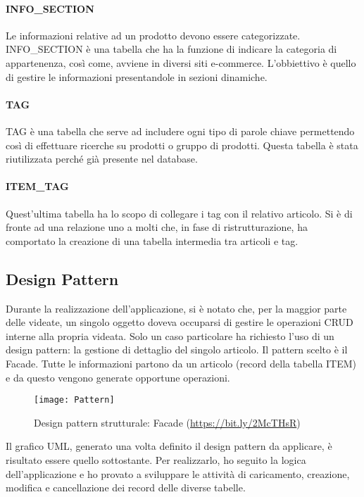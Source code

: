 \paragraph{INFO\_SECTION}
Le informazioni relative ad un prodotto devono essere categorizzate. INFO\_SECTION è una tabella che ha la funzione di indicare la categoria di appartenenza, così come, avviene in diversi siti e-commerce. L'obbiettivo è quello di gestire le informazioni presentandole in sezioni dinamiche. 

\paragraph{TAG}
TAG è una tabella che serve ad includere ogni tipo di parole chiave permettendo così di effettuare ricerche su prodotti o gruppo di prodotti. Questa tabella è stata riutilizzata perché già presente nel database.

\paragraph{ITEM\_TAG}
Quest'ultima tabella ha lo scopo di collegare i tag con il relativo articolo. Si è di fronte ad una relazione uno a molti che, in fase di ristrutturazione, ha comportato la creazione di una tabella intermedia tra articoli e tag.



\subsection{Design Pattern}
Durante la realizzazione dell'applicazione, si è notato che, per la maggior parte delle videate, un singolo oggetto doveva occuparsi di gestire le operazioni CRUD interne alla propria videata. Solo un caso particolare ha richiesto l'uso di un design pattern: la gestione di dettaglio del singolo articolo.
Il pattern scelto è il Facade. Tutte le informazioni partono da un articolo (record della tabella ITEM) e da questo vengono generate opportune operazioni.\\

\begin{figure}[!h] 
	\centering 
	\texttt{[image: Pattern]} 
	\caption{Design pattern strutturale: Facade (\url{https://bit.ly/2McTHsR})}
	\label{Pattern}
\end{figure}


Il grafico UML, generato una volta definito il design pattern da applicare, è risultato essere quello sottostante. Per realizzarlo, ho seguito la logica dell'applicazione e ho provato a sviluppare le attività di caricamento, creazione, modifica e cancellazione dei record delle diverse tabelle.

